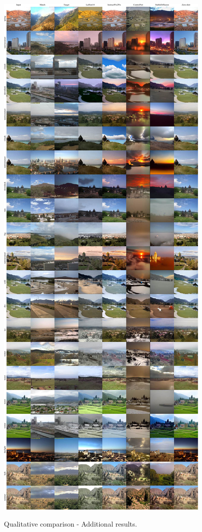 \begin{figure}[ht]
  \centering

  {\includegraphics[width=0.95\linewidth]{Chapters/appendix-figs/TAT-compressed.pdf}}

   \caption{Qualitative comparison - Additional results.}
   \label{fig:appendix-tat2}
\end{figure}

